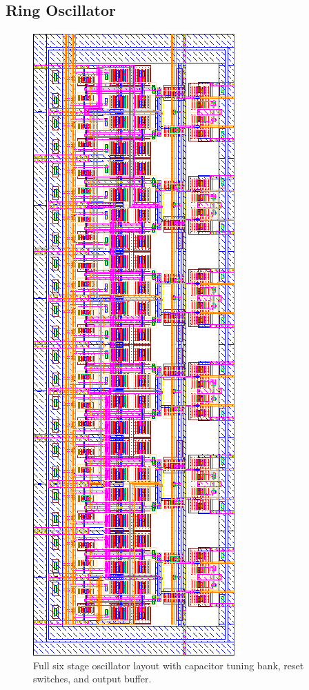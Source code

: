 		\subsection{Ring Oscillator}\label{sec:lay_osc}
				\begin{figure}[htb!]
				        \centering
				        \includegraphics[height=0.75\textheight, angle=0]{./figs/layout/full_ro}
				    \caption{Full six stage oscillator layout with capacitor tuning bank, reset switches, and output buffer.}
				\end{figure}
			\FloatBarrier\pagebreak
